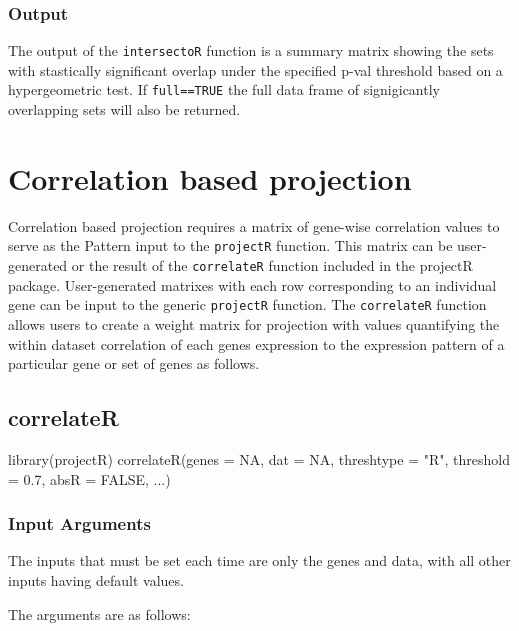 \documentclass[]{article}
\renewenvironment{verbatim}{\color{codecolor}\begin{myshaded}\begin{oldverbatim}}{\end{oldverbatim}\end{myshaded}}
\begin{document}
\hypertarget{output-3}{%
\subsubsection{Output}\label{output-3}}

The output of the \texttt{intersectoR} function is a summary matrix showing the sets with stastically significant overlap under the specified p-val threshold based on a hypergeometric test. If \texttt{full==TRUE} the full data frame of signigicantly overlapping sets will also be returned.

\hypertarget{correlation-based-projection}{%
\section{Correlation based projection}\label{correlation-based-projection}}

Correlation based projection requires a matrix of gene-wise correlation values to serve as the Pattern input to the \texttt{projectR} function. This matrix can be user-generated or the result of the \texttt{correlateR} function included in the projectR package. User-generated matrixes with each row corresponding to an individual gene can be input to the generic \texttt{projectR} function. The \texttt{correlateR} function allows users to create a weight matrix for projection with values quantifying the within dataset correlation of each genes expression to the expression pattern of a particular gene or set of genes as follows.

\hypertarget{correlater}{%
\subsection{correlateR}\label{correlater}}

\begin{verbatim}
library(projectR)
correlateR(genes = NA, dat = NA, threshtype = "R", threshold = 0.7, absR = FALSE, ...)
\end{verbatim}

\hypertarget{input-arguments-4}{%
\subsubsection{Input Arguments}\label{input-arguments-4}}

The inputs that must be set each time are only the genes and data, with all other inputs having default values.

The arguments are as follows:
\end{document}
